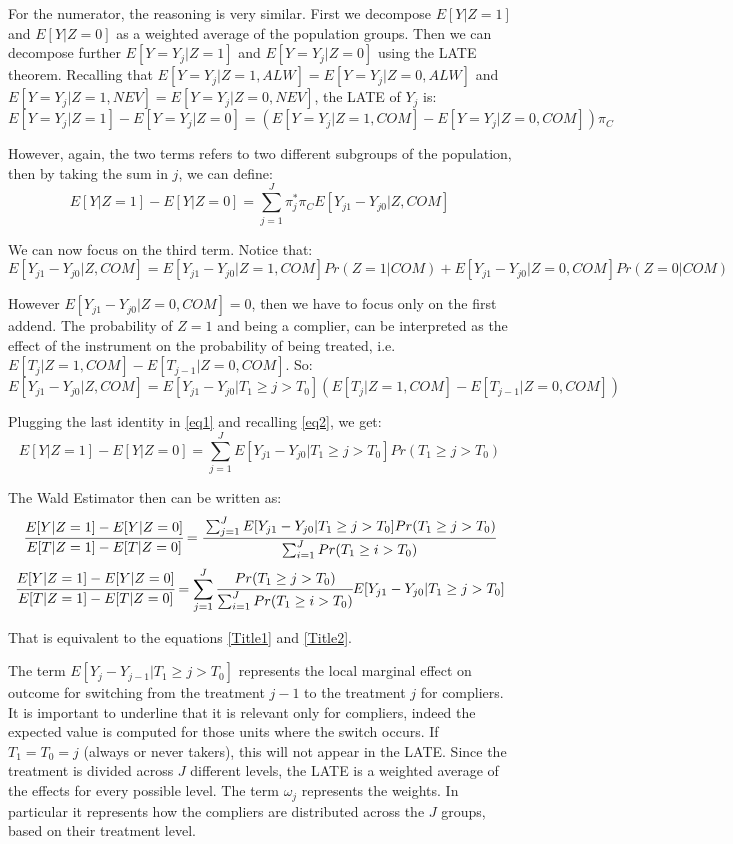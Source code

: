 \documentclass[a4paper,12pt,oneside,English]{article}
\begin{document}
For the numerator, the reasoning is very similar. First we decompose $E[Y|Z=1]$ and $E[Y|Z=0]$ as a weighted average of the population groups. Then we can decompose further $E[Y=Y_j|Z=1]$ and $E[Y=Y_j|Z=0]$ using the LATE theorem. Recalling that $E[Y=Y_j|Z=1, ALW]=E[Y=Y_j|Z=0, ALW]$ and $E[Y=Y_j|Z=1, NEV]=E[Y=Y_j|Z=0, NEV]$, the LATE of $Y_j$ is:
\[
E[Y=Y_j|Z=1]-E[Y=Y_j|Z=0]=(E[Y=Y_j|Z=1, COM]-E[Y=Y_j|Z=0, COM])\pi_C
\]

However, again, the two terms refers to two different subgroups of the population, then by taking the sum in $j$, we can define:
\begin{equation}
    E[Y|Z=1]-E[Y|Z=0]=\sum_{j=1}^J \pi_j^*\pi_C E[Y_{j1}-Y_{j0}|Z,COM]
    \label{eq1}
\end{equation}

We can now focus on the third term. Notice that:
\[
E[Y_{j1}-Y_{j0}|Z,COM]= E[Y_{j1}-Y_{j0}|Z=1,COM]Pr(Z=1|COM)+ E[Y_{j1}-Y_{j0}|Z=0,COM]Pr(Z=0|COM)
\]

However $E[Y_{j1}-Y_{j0}|Z=0,COM]=0$, then we have to focus only on the first addend. The probability of $Z=1$ and being a complier, can be interpreted as the effect of the instrument on the probability of being treated, i.e. $E[T_j|Z=1, COM]-E[T_{j-1}|Z=0, COM]$. So:
\[
E[Y_{j1}-Y_{j0}|Z,COM]=E[Y_{j1}-Y_{j0}|T_1\geq j>T_0](E[T_j|Z=1, COM]-E[T_{j-1}|Z=0, COM])
\]

Plugging the last identity in \eqref{eq1} and recalling \eqref{eq2}, we get:
\begin{equation}
    E[Y|Z=1]-E[Y|Z=0]=\sum_{j=1}^J E[Y_{j1}-Y_{j0}|T_1\geq j>T_0] Pr(T_1\geq j>T_0) 
\end{equation}

The Wald Estimator then can be written as:
\[
\cfrac{E[Y|Z=1]-E[Y|Z=0]}{E[T|Z=1]-E[T|Z=0]}=\cfrac{\sum_{j=1}^J E[Y_{j1}-Y_{j0}|T_1\geq j>T_0] Pr(T_1\geq j>T_0) }{\sum_{i=1}^J Pr(T_1\geq i>T_0) }
\]
\[
\cfrac{E[Y|Z=1]-E[Y|Z=0]}{E[T|Z=1]-E[T|Z=0]}=\sum_{j=1}^J \cfrac{Pr(T_1\geq j>T_0)}{\sum_{i=1}^J Pr(T_1\geq i>T_0)} E[Y_{j1}-Y_{j0}|T_1\geq j>T_0]
\]

That is equivalent to the equations \eqref{Title1} and \eqref{Title2}.

The term $E [Y_j - Y_{j−1}| T_1 \geq j > T_0]$ represents the local marginal effect on outcome for switching from the treatment $j-1$ to the treatment $j$ for compliers. It is important to underline that it is relevant only for compliers, indeed the expected value is computed for those units where the switch occurs. If $T_1=T_0=j$ (always or never takers), this will not appear in the LATE. 
Since the treatment is divided across $J$ different levels, the LATE is a weighted average of the effects for every possible level. The term $\omega_j$ represents the weights. In particular it represents how the compliers are distributed across the $J$ groups, based on their treatment level.
\end{document}
